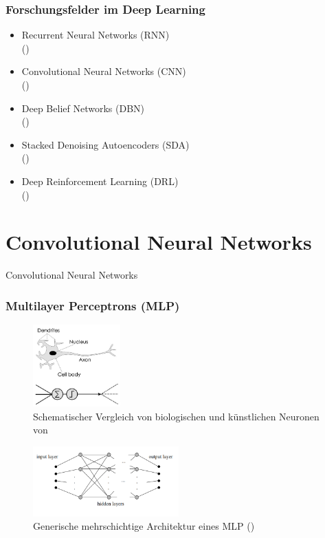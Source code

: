 \documentclass{beamer}
\begin{document}
\begin{frame}
\frametitle{Forschungsfelder im Deep Learning}
\begin{itemize}
\item Recurrent Neural Networks (RNN) 		\\ (\cite{Hochreiter1997})
\item Convolutional Neural Networks (CNN) 	\\ (\cite{LeCun1998})
\item Deep Belief Networks (DBN)				\\ (\cite{Bengio2007})
\item Stacked Denoising Autoencoders (SDA)	\\ (\cite{Vincent2008})
\item Deep Reinforcement Learning (DRL)		\\ (\cite{Mnih2013})
\end{itemize}
\end{frame}


%
%
\section{Convolutional Neural Networks}
\begin{frame}
\begin{center}
\Huge Convolutional Neural Networks
\end{center}
\end{frame}

\begin{frame}
\frametitle{Multilayer Perceptrons (MLP)}
\begin{multicols}{2}
\begin{figure}
\includegraphics[width=0.3\textwidth]{images/2_neuron}
\caption{Schematischer Vergleich von biologischen und künstlichen Neuronen von \cite{McCulloch1943}}
\end{figure}
\begin{figure}
\includegraphics[width=0.5\textwidth]{images/2_mlp}
\caption{Generische mehrschichtige Architektur eines MLP (\cite{Rojas1996}) }
\end{figure}
\end{multicols}
\end{frame}
\end{document}
